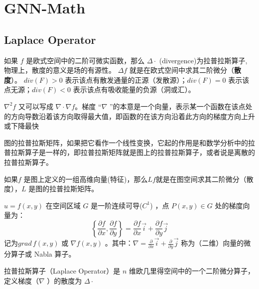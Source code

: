 
\section{GNN-Math}
     \subsection{Laplace Operator}
     如果 $ f $ 是欧式空间中的二阶可微实函数，那么 $ \Delta \cdot $ (divergence)为拉普拉斯算子, 物理上，散度的意义是场的有源性。 $ \Delta f $ 就是在欧式空间中求其二阶微分（{\textbf{散度}}）。
     $ div(F)>0 $ 表示该点有散发通量的正源（发散源）；$ div(F)= 0 $ 表示该点无源；$ div(F)< 0 $ 表示该点有吸收能量的负源（洞或汇）。
     
     $ \nabla ^{2}f $ 又可以写成  $ \nabla  \cdot \nabla  f $。梯度 “$ \nabla $ ”的本意是一个向量，表示某一个函数在该点处的方向导数沿着该方向取得最大值，即函数的在该方向沿着此方向的梯度方向上升或下降最快



     图的拉普拉斯矩阵，如果把它看作一个线性变换，它起的作用是和数学分析中的拉普拉斯算子是一样的，即拉普拉斯矩阵就是图上的拉普拉斯算子，或者说是离散的拉普拉斯算子。

     如果$ f $ 是图上定义的一组高维向量(特征)，那么$ L f $就是在图空间求其二阶微分（散度），$ L $ 是图的拉普拉斯矩阵。

     \begin{myExample}
        $ u = f(x,y) $ 在空间区域 $ G $ 是一阶连续可导($ C ^{1}$) ，点 $ P(x,y) \in G $ 处的梯度向量为：
        \[ \left \{ \frac{\partial f}{\partial x} , \frac{\partial f}{\partial y} 
        \right \}  = \frac{\partial f}{\partial x} \overrightarrow{i} + \frac{\partial f}{\partial y} \overrightarrow{j} \]
        记为$grad \, f(x,y)$ 或 $ \nabla f(x,y)$ 。其中：$ \nabla = \frac{\partial }{\partial x} \overrightarrow{i} + \frac{\partial }{\partial y} \overrightarrow{j}$
        称为（二维）向量的微分算子或 Nabla 算子。
     \end{myExample}

     拉普拉斯算子（Laplace Operator）是 $ n $ 维欧几里得空间中的一个二阶微分算子，定义梯度（$ \nabla $ ）的散度为 $ \Delta \cdot $ 

